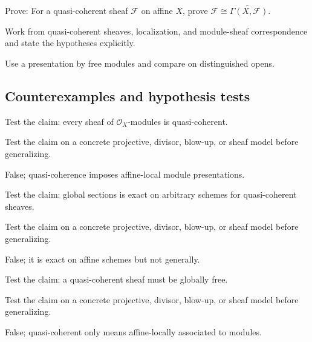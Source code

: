 \begin{exercise}\label{exr:vi33-expand-09}
Prove: For a quasi-coherent sheaf $\mathcal F$ on affine $X$, prove $\mathcal F\cong\widetilde{\Gamma(X,\mathcal F)}$.
\end{exercise}
\begin{hint}
Work from quasi-coherent sheaves, localization, and module-sheaf correspondence and state the hypotheses explicitly.
\end{hint}
\begin{solution}
Use a presentation by free modules and compare on distinguished opens.
\end{solution}

\subsection*{Counterexamples and hypothesis tests}

\begin{exercise}\label{exr:vi33-expand-10}
Test the claim: every sheaf of $\mathcal O_X$-modules is quasi-coherent.
\end{exercise}
\begin{hint}
Test the claim on a concrete projective, divisor, blow-up, or sheaf model before generalizing.
\end{hint}
\begin{solution}
False; quasi-coherence imposes affine-local module presentations.
\end{solution}

\begin{exercise}\label{exr:vi33-expand-11}
Test the claim: global sections is exact on arbitrary schemes for quasi-coherent sheaves.
\end{exercise}
\begin{hint}
Test the claim on a concrete projective, divisor, blow-up, or sheaf model before generalizing.
\end{hint}
\begin{solution}
False; it is exact on affine schemes but not generally.
\end{solution}

\begin{exercise}\label{exr:vi33-expand-12}
Test the claim: a quasi-coherent sheaf must be globally free.
\end{exercise}
\begin{hint}
Test the claim on a concrete projective, divisor, blow-up, or sheaf model before generalizing.
\end{hint}
\begin{solution}
False; quasi-coherent only means affine-locally associated to modules.
\end{solution}

